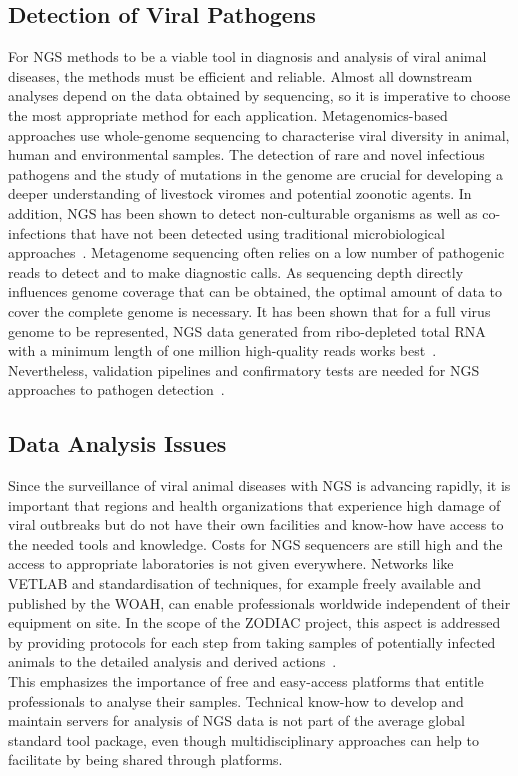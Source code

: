 \subsection{Detection of Viral Pathogens}
For NGS methods to be a viable tool in diagnosis and analysis of viral animal diseases, the methods must be efficient and reliable. Almost all downstream analyses depend on the data obtained by sequencing, so it is imperative to choose the most appropriate method for each application. Metagenomics-based approaches use whole-genome sequencing to characterise viral diversity in animal, human and environmental samples. The detection of rare and novel infectious pathogens and the study of mutations in the genome are crucial for developing a deeper understanding of livestock viromes and potential zoonotic agents. In addition, NGS has been shown to detect non-culturable organisms as well as co-infections that have not been detected using traditional microbiological approaches~\cite{cantalupo2019detecting}. Metagenome sequencing often relies on a low number of pathogenic reads to detect and to make diagnostic calls. As sequencing depth directly influences genome coverage that can be obtained, the optimal amount of data to cover the complete genome is necessary. It has been shown that for a full virus genome to be represented, NGS data generated from ribo-depleted total RNA with a minimum length of one million high-quality reads works best~\cite{visser2016next}. Nevertheless, validation pipelines and confirmatory tests are needed for NGS approaches to pathogen detection~\cite{minogue2019next}.


\subsection{Data Analysis Issues}
Since the surveillance of viral animal diseases with NGS is advancing rapidly, it is important that regions and health organizations that experience high damage of viral outbreaks but do not have their own facilities and know-how have access to the needed tools and knowledge. Costs for NGS sequencers are still high and the access to appropriate laboratories is not given everywhere. Networks like VETLAB and standardisation of techniques, for example freely available and published by the WOAH, can enable professionals worldwide independent of their equipment on site. In the scope of the ZODIAC project, this aspect is addressed by providing protocols for each step from taking samples of potentially infected animals to the detailed analysis and derived actions~\cite{zodiac2021}.\\
This emphasizes the importance of free and easy-access platforms that entitle professionals to analyse their samples. Technical know-how to develop and maintain servers for analysis of NGS data is not part of the average global standard tool package, even though multidisciplinary approaches can help to facilitate by being shared through platforms.

